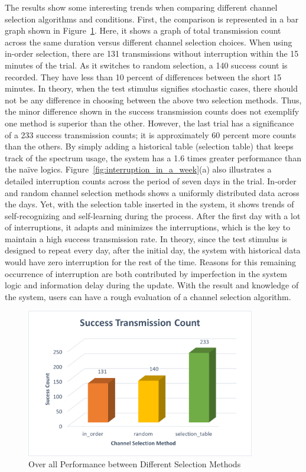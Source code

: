 The results show some interesting trends when comparing different channel selection algorithms and conditions. First, the comparison is represented in a bar graph shown in Figure~\ref{fig:performance_with_different_methods}. Here, it shows a graph of total transmission count across the same duration versus different channel selection choices. When using in-order selection, there are 131 transmissions without interruption within the 15 minutes of the trial. As it switches to random selection, a 140 success count is recorded. They have less than 10 percent of differences between the short 15 minutes. In theory, when the test stimulus signifies stochastic cases, there should not be any difference in choosing between the above two selection methods. Thus, the minor difference shown in the success transmission counts does not exemplify one method is superior than the other. However, the last trial has a significance of a 233 success transmission counts; it is approximately 60 percent more counts than the others. By simply adding a historical table (selection table) that keeps track of the spectrum usage, the system has a 1.6 times greater performance than the na\"ive logics. Figure~\ref{fig:interruption_in_a_week}(a) also illustrates a detailed interruption counts across the period of seven days in the trial. In-order and random channel selection methods shows a uniformly distributed data across the days. Yet, with the selection table inserted in the system, it shows trends of self-recognizing and self-learning during the process. After the first day with a lot of interruptions, it adapts and minimizes the interruptions, which is the key to maintain a high success transmission rate. In theory, since the test stimulus is designed to repeat every day, after the initial day, the system with historical data would have zero interruption for the rest of the time. Reasons for this remaining occurrence of interruption are both contributed by imperfection in the system logic and information delay during the update. With the result and knowledge of the system, users can have a rough evaluation of a channel selection algorithm.


\begin{figure}[ht]
\centering
\includegraphics[width=10cm]{figures/total_success_count.png}
\caption{Over all Performance between Different Selection Methods}
\label{fig:performance_with_different_methods}
\end{figure}


